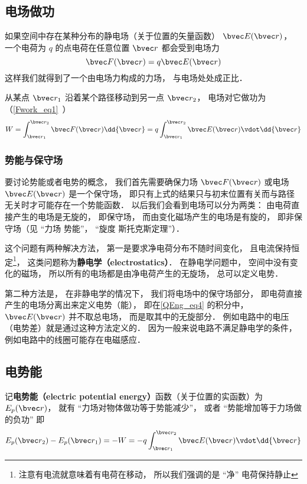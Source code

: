 

\subsection{电场做功}
如果空间中存在某种分布的静电场（关于位置的矢量函数） $\bvec E(\bvec r)$， 一个电荷为 $q$ 的点电荷在任意位置 $\bvec r$ 都会受到电场力
\begin{equation}
\bvec F(\bvec r) = q \bvec E(\bvec r)
\end{equation}
这样我们就得到了一个由电场力构成的力场， 与电场处处成正比． 

从某点 $\bvec r_1$ 沿着某个路径移动到另一点 $\bvec r_2$， 电场对它做功为（\autoref{Fwork_eq1}~）
\begin{equation}\label{QEng_eq4}
W = \int_{\bvec r_1}^{\bvec r_2} \bvec F(\bvec r) \dd{\bvec r} = q \int_{\bvec r_1}^{\bvec r_2} \bvec E(\bvec r) \vdot \dd{\bvec r}
\end{equation}

\subsubsection{势能与保守场}
要讨论势能或者电势的概念， 我们首先需要确保力场 $\bvec F(\bvec r)$ 或电场 $\bvec E(\bvec r)$ 是一个保守场， 即只有上式的结果只与初末位置有关而与路径无关时才可能存在一个势能函数． 以后我们会看到电场可以分为两类： 由电荷直接产生的电场是无旋的， 即保守场， 而由变化磁场产生的电场是有旋的， 即非保守场（见 “力场 势能”， “旋度 斯托克斯定理”）．

这个问题有两种解决方法， 第一是要求净电荷分布不随时间变化， 且电流保持恒定\footnote{注意有电流就意味着有电荷在移动， 所以我们强调的是 “净” 电荷保持静止}， 这类问题称为\textbf{静电学（electrostatics）}． 在静电学问题中， 空间中没有变化的磁场， 所以所有的电场都是由净电荷产生的无旋场， 总可以定义电势．

第二种方法是， 在非静电学的情况下， 我们将电场中的保守场部分， 即电荷直接产生的电场分离出来定义电势（能）， 即在\autoref{QEng_eq4} 的积分中， $\bvec E(\bvec r)$ 并不取总电场， 而是取其中的无旋部分． 例如电路中的电压（电势差）就是通过这种方法定义的． 因为一般来说电路不满足静电学的条件， 例如电路中的线圈可能存在电磁感应．

\subsection{电势能}
记\textbf{电势能（electric potential energy）}函数（关于位置的实函数）为 $E_p(\bvec r)$， 就有 “力场对物体做功等于势能减少”， 或者 “势能增加等于力场做的负功” 即
\begin{equation}\label{QEng_eq5}
E_p(\bvec r_2) - E_p(\bvec r_1) = -W = -q \int_{\bvec r_1}^{\bvec r_2} \bvec E(\bvec r) \vdot \dd{\bvec r}
\end{equation}

